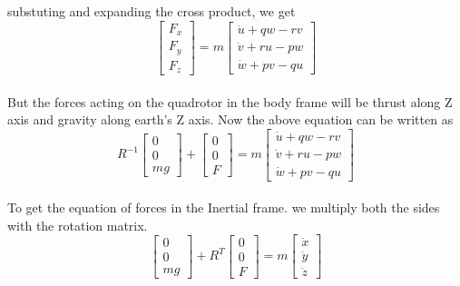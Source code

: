 \noindent
substuting and expanding the cross product, we get
\begin{equation*}
  \left[
  \begin{matrix}
    F_x \\
    F_y\\
    F_z
  \end{matrix}
  \right] =m
  \left[
  \begin{matrix}
    \dot{u} +qw -rv \\
    \dot{v} +ru -pw\\
    \dot{w} +pv -qu
  \end{matrix}
  \right]
\end{equation*}\\

But the forces acting on the quadrotor in the body frame will be thrust along Z axis and gravity along earth's Z axis. Now the above equation can be written as
\begin{equation*}
  R^{-1}\left[
  \begin{matrix}
    0\\
    0\\
    mg
  \end{matrix}
  \right]+
  \left[
  \begin{matrix}
    0 \\
    0\\
    F
  \end{matrix}
  \right]
   =m
  \left[
  \begin{matrix}
    \dot{u} +qw -rv \\
    \dot{v} +ru -pw\\
    \dot{w} +pv -qu
  \end{matrix}
  \right]
\end{equation*}\\

To get the equation of forces in the Inertial frame. we multiply both the sides with the rotation matrix.
\begin{equation*}
  \left[
  \begin{matrix}
    0\\
    0\\
    mg
  \end{matrix}
  \right]+
  R^T\left[
  \begin{matrix}
    0 \\
    0\\
    F
  \end{matrix}
  \right]
   =m
  \left[
  \begin{matrix}
    \ddot{x}\\
    \ddot{y}\\
    \ddot{z}
  \end{matrix}
  \right]
\end{equation*}
